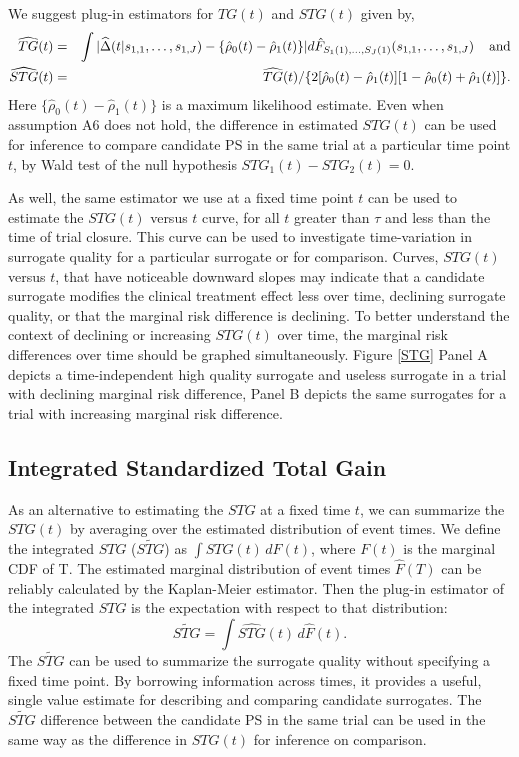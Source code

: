 \documentclass[times, doublespace]{simauth}
\begin{document}
We suggest plug-in estimators for $TG(t)$ and $STG(t)$ given by, 
\begin{eqnarray}
\widehat{TG}(t)&=&\int{|\widehat{\Delta}(t|s_{1,1}, \dots, s_{1,J}) -\{\hat{\rho}_0(t) -\hat{\rho}_1(t)\}|d\hat{F}_{S_1(1), \ldots, S_J(1)}(s_{1,1}, \dots, s_{1,J})} \hspace{4mm} \mbox{and} \label{TG} \\
\widehat{STG}(t)&=&\widehat{TG}(t)/\{2[\hat{\rho}_0(t) - \hat{\rho}_1(t)][1-\hat{\rho}_0(t) + \hat{\rho}_1(t)]\}.
\end{eqnarray}
Here $\{\hat{\rho}_0(t) -\hat{\rho}_1(t)\}$ is a maximum likelihood estimate. Even when assumption A6 does not hold, the difference in estimated $STG(t)$ can be used for inference to compare candidate PS in the same trial at a particular time point $t$, by Wald test of the null hypothesis $STG_1(t)-STG_2(t)=0$. 

As well, the same estimator we use at a fixed time point $t$ can be used to estimate the $STG(t)$ versus $t$ curve, for all $t$ greater than $\tau$ and less than the time of trial closure. This curve can be used to investigate time-variation in surrogate quality for a particular surrogate or for comparison. Curves, $STG(t)$ versus $t$, that have noticeable downward slopes may indicate that a candidate surrogate modifies the clinical treatment effect less over time, declining surrogate quality, or that the marginal risk difference is declining. To better understand the context of declining or increasing $STG(t)$ over time, the marginal risk differences over time should be graphed simultaneously. Figure \ref{STG} Panel A depicts a time-independent high quality surrogate and useless surrogate in a trial with declining marginal risk difference, Panel B depicts the same surrogates for a trial with increasing marginal risk difference. 

\subsection{Integrated Standardized Total Gain} \label{ISTG}
As an alternative to estimating the $STG$ at a fixed time $t$, we can summarize the $STG(t)$ by averaging over the estimated distribution of event times. We define the integrated $STG$ ($\widetilde{STG}$) as $\int STG(t) \, dF(t)$, where $F(t)$ is the marginal CDF of T. The estimated marginal distribution of event times $\hat{F}(T)$ can be reliably calculated by the Kaplan-Meier estimator. Then the plug-in estimator of the integrated $STG$ is the expectation with respect to that distribution:
\[
 \widetilde{STG} = \int \widehat{STG}(t) \, d \hat{F}(t). 
\]
The $\widetilde{STG}$ can be used to summarize the surrogate quality without specifying a fixed time point. By borrowing information across times, it provides a useful, single value estimate for describing and comparing candidate surrogates. The $\widetilde{STG}$ difference between the candidate PS in the same trial can be used in the same way as the difference in $STG(t)$ for inference on comparison.
\end{document}
